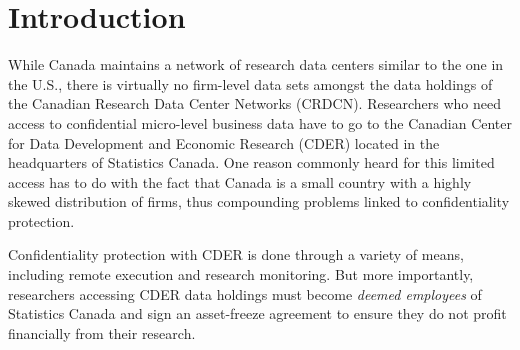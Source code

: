 \documentclass{article}
\begin{document}
\section{Introduction}
While Canada maintains a network of research data centers similar to the one in the U.S., there is virtually no firm-level data sets amongst the data holdings of the Canadian Research Data Center Networks (CRDCN). Researchers who need access to confidential micro-level business data have to go to the Canadian Center for Data Development and Economic Research (CDER) located in the headquarters of Statistics Canada. One reason commonly heard for this limited access has to do with the fact that Canada is a small country with a highly skewed distribution of firms, thus compounding problems linked to confidentiality protection. 

Confidentiality protection with CDER is done through a variety of means, including remote execution and research monitoring. But more importantly, researchers accessing CDER data holdings must become \textit{deemed employees} of Statistics Canada and sign an asset-freeze agreement to ensure they do not profit financially from their research.
\end{document}
